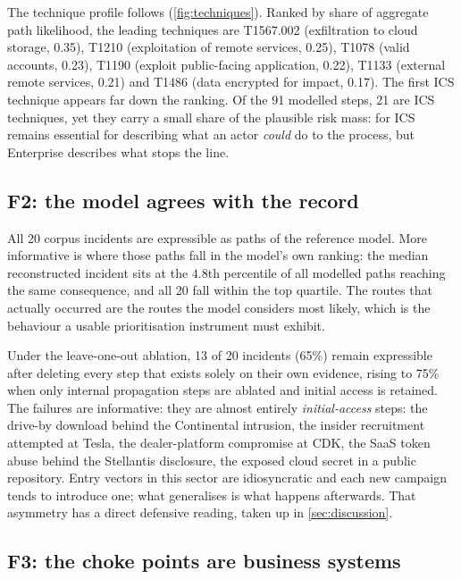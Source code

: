 


The technique profile follows (\cref{fig:techniques}). Ranked by share of
aggregate path likelihood, the leading techniques are T1567.002
(exfiltration to cloud storage, 0.35), T1210 (exploitation of remote services,
0.25), T1078 (valid accounts, 0.23), T1190 (exploit public-facing application,
0.22), T1133 (external remote services, 0.21) and T1486 (data encrypted for
impact, 0.17). The first ICS technique appears far down the ranking. Of the 91
modelled steps, 21 are ICS techniques, yet they carry a small share of the
plausible risk mass: \attck{} for ICS remains essential for describing what an
actor \emph{could} do to the process, but \attck{} Enterprise describes what
stops the line.



\subsection{F2: the model agrees with the record}

All 20 corpus incidents are expressible as paths of the reference model. More
informative is where those paths fall in the model's own ranking: the median
reconstructed incident sits at the $4.8$th percentile of all modelled paths
reaching the same consequence, and all 20 fall within the top quartile. The
routes that actually occurred are the routes the model considers most likely,
which is the behaviour a usable prioritisation instrument must exhibit.

Under the leave-one-out ablation, 13 of 20 incidents (65\%) remain expressible
after deleting every step that exists solely on their own evidence, rising to
75\% when only internal propagation steps are ablated and initial access is
retained. The failures are informative: they are almost entirely
\emph{initial-access} steps: the drive-by download behind the Continental
intrusion, the insider recruitment attempted at Tesla, the dealer-platform
compromise at CDK, the SaaS token abuse behind the Stellantis disclosure, the
exposed cloud secret in a public repository. Entry vectors in this sector are
idiosyncratic and each new campaign tends to introduce one; what generalises is
what happens afterwards. That asymmetry has a direct defensive reading, taken
up in \cref{sec:discussion}.

\subsection{F3: the choke points are business systems}


